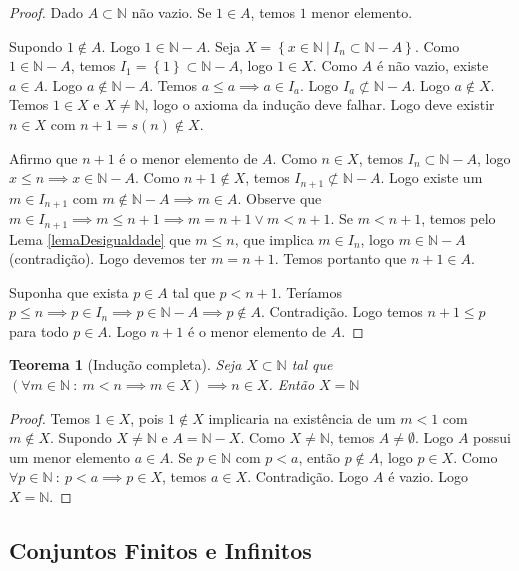 \documentclass{article}
\theoremstyle{plain}
\newtheorem{teo}{Teorema}
\theoremstyle{definition}
\theoremstyle{remark}
\begin{document}
\begin{proof}
	Dado $A\subset \mathbb{N}$ não vazio. Se $1\in A$, temos $1$ menor elemento.  

	Supondo $1\not \in A$. Logo $1\in \mathbb{N} - A$.  Seja $X = \left\{ x \in \mathbb{N} \: | \:  I_n \subset \mathbb{N} - A \right\}$.   Como $1\in \mathbb{N} - A$, temos $I_1 = \left\{1\right\} \subset \mathbb{N} - A$, logo $1 \in X$.   Como  $A$ é não vazio, existe $a\in A$. Logo $a\not \in \mathbb{N} -A$.  Temos $a\leq a \implies a\in I_a$. Logo $I_a \not \subset \mathbb{N} - A$.   Logo $a \not \in X$. Temos $1 \in X$ e $X\neq \mathbb{N}$, logo o axioma da indução deve falhar. Logo deve existir $n\in X$ com $n+1 = s(n)\not \in X$. 

	Afirmo que $n+1$ é o menor elemento de $A$.  Como $n\in X$, temos $I_n \subset \mathbb{N} - A$, logo $x \leq n \implies x \in \mathbb{N} - A$. Como $n+1\not \in X$, temos $I_{n+1} \not \subset \mathbb{N} - A$.  Logo existe um $m \in I_{n+1}$ com $m\not \in \mathbb{N} - A\implies m  \in A$. Observe que $m\in I_{n+1} \implies m \leq n+1 \implies m = n+1 \lor m<n+1$. Se $m < n+1$, temos pelo Lema \ref{lemaDesigualdade} que $m\leq n$, que implica $m\in I_{n}$, logo $m\in \mathbb{N} - A$ (contradição). Logo devemos ter $m = n+1$. Temos portanto que $n+1\in A$. 


	Suponha que exista $p \in A$ tal que $p < n+1$.  Teríamos $p\leq n \implies p \in I_n \implies p \in \mathbb{N} -A \implies p \not \in A$. Contradição. Logo temos $n+1\leq p$ para todo $p\in A$. Logo $n+1$ é o menor elemento de $A$.
\end{proof}
\begin{teo}[Indução completa]
	Seja $X \subset \mathbb{N}$ tal que $( \forall m \in \mathbb{N} \: : \: m < n \implies m\in X) \implies n \in X $. Então $X = \mathbb{N}$
\end{teo}
\begin{proof}
	Temos $1 \in X$, pois $1\not \in X$ implicaria na existência de um $m < 1$ com $m\not \in X$.    Supondo $X\neq \mathbb{N}$ e $A = \mathbb{N} - X$. Como $X\neq \mathbb{N}$, temos $A \neq \emptyset$. Logo $A$ possui um menor elemento $a\in A$.  Se $p\in \mathbb{N}$ com $p < a $, então $p \not \in A$, logo $p\in X$. Como $ \forall p \in \mathbb{N} \: : \: p < a \implies p \in X$, temos $a \in X$. Contradição. Logo $A$ é vazio. Logo $X = \mathbb{N}$.
\end{proof}


\subsection{Conjuntos Finitos e Infinitos}
\end{document}
